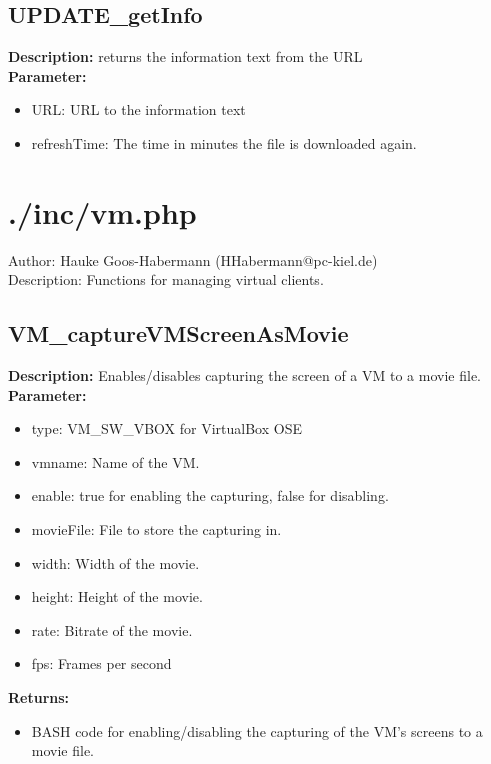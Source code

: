 \subsection{UPDATE\_getInfo}
\textbf{Description:} returns the information text from the URL\\
\textbf{Parameter:}
\begin{itemize}
\item URL: URL to the information text
\item refreshTime: The time in minutes the file is downloaded again.
\end{itemize}

\newpage\section{./inc/vm.php}
 Author: Hauke Goos-Habermann (HHabermann@pc-kiel.de)\\
 Description: Functions for managing virtual clients.\\

\subsection{VM\_captureVMScreenAsMovie}
\textbf{Description:} Enables/disables capturing the screen of a VM to a movie file.\\
\textbf{Parameter:}
\begin{itemize}
\item type: VM\_SW\_VBOX for VirtualBox OSE
\item vmname: Name of the VM.
\item enable: true for enabling the capturing, false for disabling.
\item movieFile: File to store the capturing in.
\item width: Width of the movie.
\item height: Height of the movie.
\item rate: Bitrate of the movie.
\item fps: Frames per second
\end{itemize}
\textbf{Returns:}
\begin{itemize}
\item BASH code for enabling/disabling the capturing of the VM's screens to a movie file.
\end{itemize}

